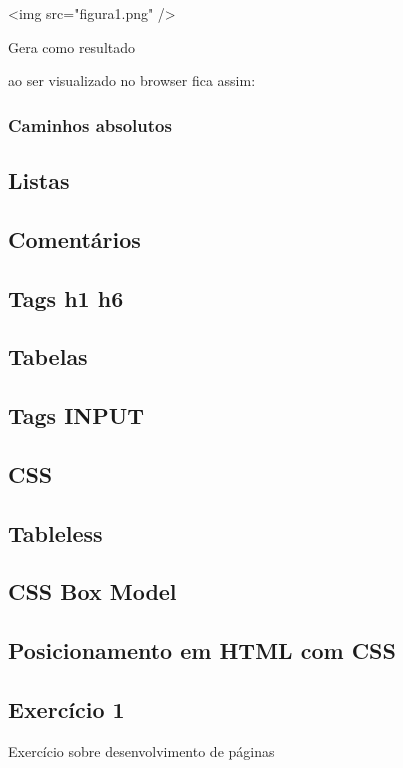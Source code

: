 <img src="figura1.png" />

Gera como resultado 

ao ser visualizado no browser fica assim:


\subsubsection{Caminhos absolutos}



\subsection{Listas}

\subsection{Comentários}

\subsection{Tags h1 h6}

\subsection{Tabelas}

\subsection{Tags INPUT}

\subsection{CSS}

\subsection{Tableless}

\subsection{CSS Box Model}

\subsection{Posicionamento em HTML com CSS}

\subsection{Exercício 1}
Exercício sobre desenvolvimento de páginas

